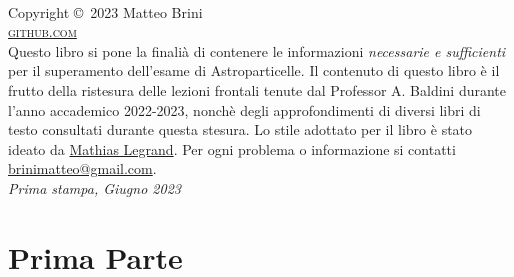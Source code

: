 \documentclass[
	11pt, %
	fleqn, %
	a4paper, %
]{LegrandOrangeBook}
\begin{document}

\thispagestyle{empty} %

~\vfill %

\noindent Copyright \copyright\ 2023 Matteo Brini\\ %

\noindent \textsc{\href{https://github.com/brinus}{github.com}}\\ %

\noindent Questo libro si pone la finalià di contenere le informazioni \textit{necessarie e sufficienti} per il superamento dell'esame di Astroparticelle. Il contenuto di questo libro è il frutto della ristesura delle lezioni frontali tenute dal Professor A. Baldini durante l'anno accademico 2022-2023, nonchè degli approfondimenti di diversi libri di testo consultati durante questa stesura. Lo stile adottato per il libro è stato ideato da \href{https://www.latextemplates.com/template/legrand-orange-book}{Mathias Legrand}. Per ogni problema o informazione si contatti \href{mailto:brinimatte@gmail.com}{brinimatteo@gmail.com}.\\
\noindent \textit{Prima stampa, Giugno 2023} %


\pagestyle{empty} %

\tableofcontents %

\pagestyle{fancy} %

\cleardoublepage %

\part{Prima Parte}




\begin{appendices} %
\renewcommand{\chaptername}{Appendice}

	

\end{appendices} %
\end{document}
